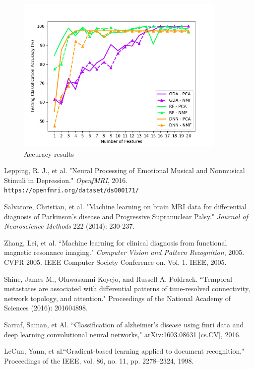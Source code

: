 \documentclass{article}[12pt]
\begin{document}
    \begin{figure}[!htb]
   	\centering
   	\includegraphics[width=4in]{../plots/fdim_vs_accuracy_all.png}
   	\caption{Accuracy results}
   	\label{fig:accuracyResults}
   \end{figure}
   
   \newpage
   \begin{thebibliography}{9}
   	
   	Lepping, R. J., et al. "Neural Processing of Emotional Musical and Nonmusical Stimuli in Depression." \textit{OpenfMRI}, 2016.\\
   	\texttt{https://openfmri.org/dataset/ds000171/}
   	
   	Salvatore, Christian, et al. "Machine learning on brain MRI data for differential diagnosis of Parkinson's disease and Progressive Supranuclear Palsy." \textit{Journal of Neuroscience Methods} 222 (2014): 230-237.
   	
   	Zhang, Lei, et al. ``Machine learning for clinical diagnosis from functional magnetic resonance imaging." \textit{Computer Vision and Pattern Recognition}, 2005. CVPR 2005. IEEE Computer Society Conference on. Vol. 1. IEEE, 2005.
   	
   	Shine, James M., Oluwasanmi Koyejo, and Russell A. Poldrack. ``Temporal metastates are associated with differential patterns of time-resolved connectivity, network topology, and attention." Proceedings of the National Academy of Sciences (2016): 201604898.
   
   Sarraf, Saman, et Al. ``Classification  of alzheimer’s disease using fmri data and deep learning convolutional neural networks," arXiv:1603.08631 [cs.CV], 2016.
   	
   	LeCun, Yann, et al.``Gradient-based learning applied to document recognition," Proceedings of the IEEE, vol. 86, no. 11, pp. 2278–2324, 1998. 
   	\end{thebibliography}
   
   
   
   
   
\end{document}
